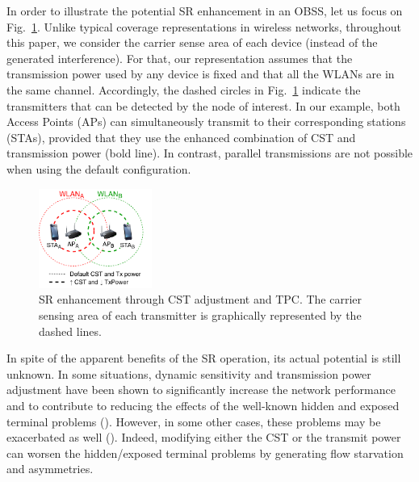 \documentclass[preprint,12pt]{elsarticle}
\begin{document}
	In order to illustrate the potential SR enhancement in an OBSS, let us focus on Fig.~\ref{fig:spatial_reuse_11ax}. Unlike typical coverage representations in wireless networks, throughout this paper, we consider the carrier sense area of each device (instead of the generated interference). For that, our representation assumes that the transmission power used by any device is fixed and that all the WLANs are in the same channel. Accordingly, the dashed circles in Fig.~\ref{fig:spatial_reuse_11ax} indicate the transmitters that can be detected by the node of interest. In our example, both Access Points (APs) can simultaneously transmit to their corresponding stations (STAs), provided that they use the enhanced combination of CST and transmission power (bold line). In contrast, parallel transmissions are not possible when using the default configuration.
	\begin{figure}[ht!]
		\centering
		\includegraphics[width=0.33\textwidth]{fig_1.pdf}
		\caption{SR enhancement through CST adjustment and TPC. The carrier sensing area of each transmitter is graphically represented by the dashed lines.}
		\label{fig:spatial_reuse_11ax}
	\end{figure}
	
	In spite of the apparent benefits of the SR operation, its actual potential is still unknown. In some situations, dynamic sensitivity and transmission power adjustment have been shown to significantly increase the network performance and to contribute to reducing the effects of the well-known hidden and exposed terminal problems (\citealp{zhou2005balancing}). However, in some other cases, these problems may be exacerbated as well (\citealp{wilhelmi2019potential}). Indeed, modifying either the CST or the transmit power can worsen the hidden/exposed terminal problems by generating flow starvation and asymmetries.
	
\end{document}
